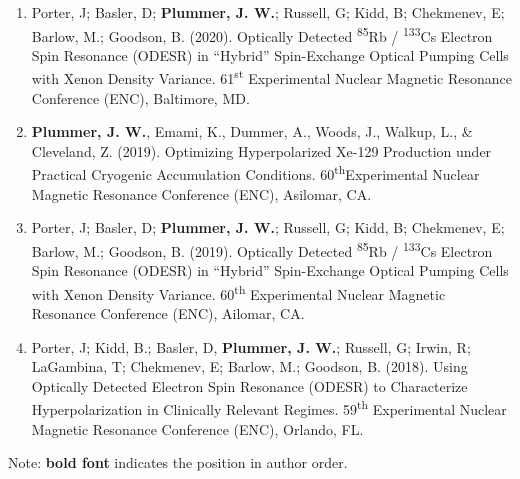 \documentclass[12pt,]{scrartcl}
\begin{document}
\begin{enumerate}
  \item Porter, J; Basler, D; \textbf{Plummer, J. W.}; Russell, G; Kidd, B; Chekmenev, E; Barlow, M.; Goodson, B. (2020). Optically Detected \textsuperscript{85}Rb / \textsuperscript{133}Cs Electron Spin Resonance (ODESR) in “Hybrid” Spin-Exchange Optical Pumping Cells with Xenon Density Variance. 61\textsuperscript{st} Experimental Nuclear Magnetic Resonance Conference (ENC), Baltimore, MD. 
  \item \textbf{Plummer, J. W.}, Emami, K., Dummer, A., Woods, J., Walkup, L., \& Cleveland, Z. (2019). Optimizing Hyperpolarized Xe-129 Production under Practical Cryogenic Accumulation Conditions. 60\textsuperscript{th}Experimental Nuclear Magnetic Resonance Conference (ENC), Asilomar, CA. 
  \item Porter, J; Basler, D; \textbf{Plummer, J. W.}; Russell, G; Kidd, B; Chekmenev, E; Barlow, M.; Goodson, B. (2019). Optically Detected \textsuperscript{85}Rb / \textsuperscript{133}Cs Electron Spin Resonance (ODESR) in “Hybrid” Spin-Exchange Optical Pumping Cells with Xenon Density Variance. 60\textsuperscript{th} Experimental Nuclear Magnetic Resonance Conference (ENC), Ailomar, CA. 
  \item Porter, J; Kidd, B.; Basler, D, \textbf{Plummer, J. W.}; Russell, G; Irwin, R; LaGambina, T; Chekmenev, E; Barlow, M.; Goodson, B. (2018). Using Optically Detected Electron Spin Resonance (ODESR) to Characterize Hyperpolarization in Clinically Relevant Regimes. 59\textsuperscript{th} Experimental Nuclear Magnetic Resonance Conference (ENC), Orlando, FL. 

  
\end{enumerate}
Note: \textbf{bold font} indicates the position in author order.




\end{document}
